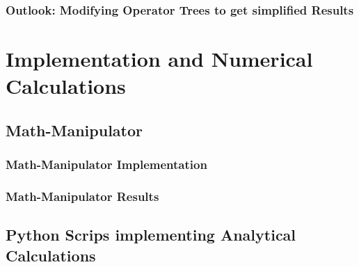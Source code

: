 \documentclass[
headings=optiontohead,              %
12pt,                               %
DIV=13,                             %
twoside=false,                      %
open=right,                         %
BCOR=00mm,                          %
toc=bibliographynumbered            %
]{scrreport}
\begin{document}
        \subsection{Outlook: Modifying Operator Trees to get \glqq simplified\grqq{} Results}
        \label{sec:theory-operator-tree-simplification}
        
        \FloatBarrier

\chapter{Implementation and Numerical Calculations}
\label{sec:implementation-and-numerical}

\FloatBarrier

    \section{Math-Manipulator}
    \label{sec:math-manipulator-introduction}
    
    \FloatBarrier
    
        \subsection{Math-Manipulator Implementation}
        \label{sec:implementation-math-manipulator}
        

        \subsection{Math-Manipulator Results}
        \label{sec:results-math-manipulator}
        

    \section{Python Scrips implementing Analytical Calculations}
    \label{sec:implementation-analytical-calculations}
    
    \FloatBarrier
            
        



\end{document}
